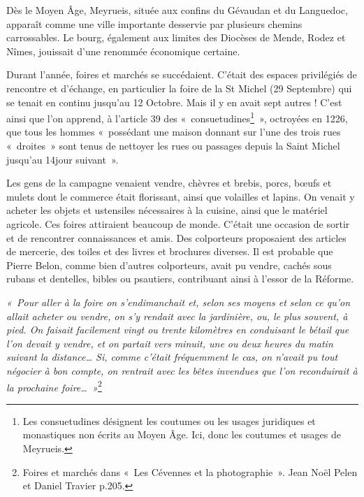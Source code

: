 





\vspace{0.75em}

Dès le Moyen Âge, Meyrueis, située aux confins du Gévaudan et du Languedoc, apparaît comme une ville importante desservie par plusieurs chemins carrossables. Le bourg, également aux limites des Diocèses de Mende, Rodez et Nîmes, jouissait d’une renommée économique certaine.

Durant l’année, foires et marchés se succédaient. C’était des espaces privilégiés de rencontre et d’échange, en particulier la foire de la St Michel (29 Septembre) qui se tenait en continu jusqu’au 12 Octobre. Mais il y en avait sept autres !
C’est ainsi que l’on apprend, à l’article 39 des «~consuetudines\footnote{Les consuetudines désignent les coutumes ou les usages juridiques et monastiques non écrits au Moyen Âge. Ici, donc les coutumes et usages de Meyrueis.}~», octroyées en 1226, que tous les hommes «~possédant une maison donnant sur l’une des trois rues «~droites~» sont tenus de nettoyer les rues ou passages depuis la Saint Michel jusqu’au 14\ieme jour suivant~».

Les gens de la campagne venaient vendre, chèvres et brebis, porcs, bœufs et mulets dont le commerce était florissant, ainsi que volailles et lapins. On venait y acheter les objets et ustensiles nécessaires à la cuisine, ainsi que le matériel agricole.
Ces foires attiraient beaucoup de monde. C’était une occasion de sortir et de rencontrer connaissances et amis. Des colporteurs proposaient des articles de mercerie, des toiles et des livres et brochures diverses. Il est probable que Pierre Belon, comme bien d’autres colporteurs, avait pu vendre, cachés sous rubans et dentelles, bibles ou psautiers, contribuant ainsi à l’essor de la Réforme.

\medskip

\textit{«~Pour aller à la foire on s’endimanchait et, selon ses moyens et selon ce qu’on allait acheter ou vendre, on s’y rendait avec la jardinière, ou, le plus souvent, à pied. On faisait facilement vingt ou trente kilomètres en conduisant le bétail que l’on devait y vendre, et on partait vers minuit, une ou deux heures du matin suivant la distance… Si, comme c’était fréquemment le cas, on n’avait pu tout négocier à bon compte, on rentrait avec les bêtes invendues que l’on reconduirait à la prochaine foire…~»}\footnote{Foires et marchés dans «~Les Cévennes et la photographie~». Jean Noël Pelen et Daniel Travier p.205.}

